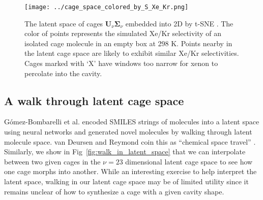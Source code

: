 \documentclass[journal=jacsat,manuscript=article,layout=traditional]{achemso}
\begin{document}
\begin{figure}
\centering
	\texttt{[image: ../cage\_space\_colored\_by\_S\_Xe\_Kr.png]}
	\caption{The latent space of cages $\mathbf{U}_\nu \mathbf{\Sigma}_\nu$ embedded into 2D by t-SNE \cite{maaten2008visualizing,wattenberg2016how}. The color of points represents the simulated Xe/Kr selectivity of an isolated cage molecule in an empty box at 298 K. Points nearby in the latent cage space are likely to exhibit similar Xe/Kr selectivities. Cages marked with `X' have windows too narrow for xenon to percolate into the cavity.
	} \label{fig:latent_space_S_Xe_Kr}
\end{figure}

\subsection{A walk through latent cage space}
\label{sec:latentwalk}
G\'{o}mez-Bombarelli et al. \cite{gomez2018automatic} encoded SMILES strings of molecules into a latent space using neural networks and generated novel molecules by walking through latent molecule space. van Deursen and Reymond coin this as ``chemical space travel'' \cite{van2007chemical}. Similarly, we show in Fig~\ref{fig:walk_in_latent_space} that we can interpolate between two given cages in the $\nu=23$ dimensional latent cage space to see how one cage morphs into another.
While an interesting exercise to help interpret the latent space, walking in our latent cage space may be of limited utility since it remains unclear of how to synthesize a cage with a given cavity shape.
\end{document}
